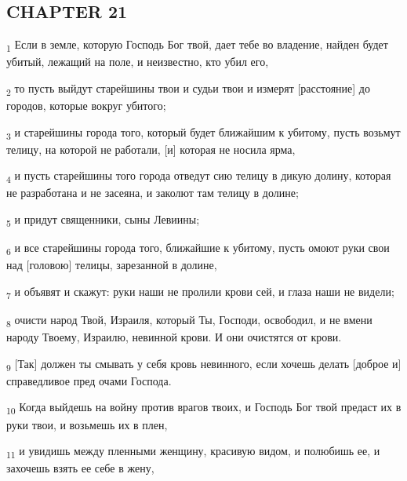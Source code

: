 \subsection{CHAPTER 21}
\begin{tcolorbox}
\textsubscript{1} Если в земле, которую Господь Бог твой, дает тебе во владение, найден будет убитый, лежащий на поле, и неизвестно, кто убил его,
\end{tcolorbox}
\begin{tcolorbox}
\textsubscript{2} то пусть выйдут старейшины твои и судьи твои и измерят [расстояние] до городов, которые вокруг убитого;
\end{tcolorbox}
\begin{tcolorbox}
\textsubscript{3} и старейшины города того, который будет ближайшим к убитому, пусть возьмут телицу, на которой не работали, [и] которая не носила ярма,
\end{tcolorbox}
\begin{tcolorbox}
\textsubscript{4} и пусть старейшины того города отведут сию телицу в дикую долину, которая не разработана и не засеяна, и заколют там телицу в долине;
\end{tcolorbox}
\begin{tcolorbox}
\textsubscript{5} и придут священники, сыны Левиины;
\end{tcolorbox}
\begin{tcolorbox}
\textsubscript{6} и все старейшины города того, ближайшие к убитому, пусть омоют руки свои над [головою] телицы, зарезанной в долине,
\end{tcolorbox}
\begin{tcolorbox}
\textsubscript{7} и объявят и скажут: руки наши не пролили крови сей, и глаза наши не видели;
\end{tcolorbox}
\begin{tcolorbox}
\textsubscript{8} очисти народ Твой, Израиля, который Ты, Господи, освободил, и не вмени народу Твоему, Израилю, невинной крови. И они очистятся от крови.
\end{tcolorbox}
\begin{tcolorbox}
\textsubscript{9} [Так] должен ты смывать у себя кровь невинного, если хочешь делать [доброе и] справедливое пред очами Господа.
\end{tcolorbox}
\begin{tcolorbox}
\textsubscript{10} Когда выйдешь на войну против врагов твоих, и Господь Бог твой предаст их в руки твои, и возьмешь их в плен,
\end{tcolorbox}
\begin{tcolorbox}
\textsubscript{11} и увидишь между пленными женщину, красивую видом, и полюбишь ее, и захочешь взять ее себе в жену,
\end{tcolorbox}
